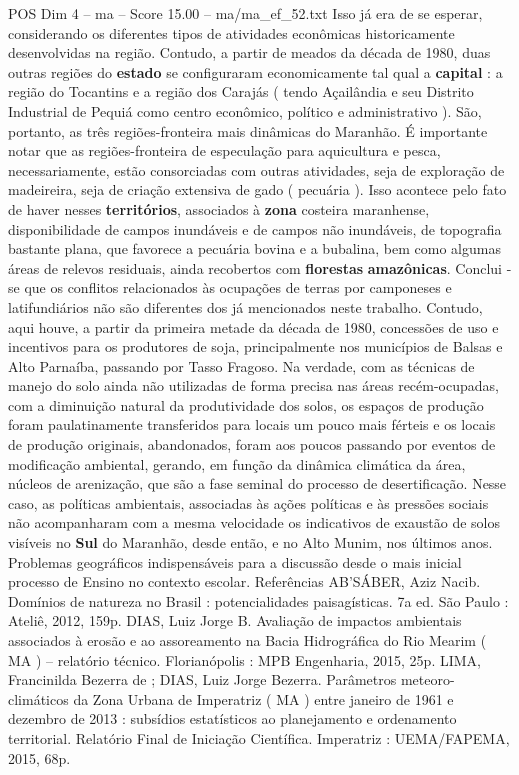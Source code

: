 \begin{textsample}{POS Dim 4 – ma – Score 15.00 – ma/ma\_ef\_52.txt}
Isso já era de se esperar, considerando os diferentes tipos de atividades econômicas historicamente desenvolvidas na região.
Contudo, a partir de meados da década de 1980, duas outras regiões do \textbf{estado} se configuraram economicamente tal qual a \textbf{capital} : a região do Tocantins e a região dos Carajás ( tendo Açailândia e seu Distrito Industrial de Pequiá como centro econômico, político e administrativo ).
São, portanto, as três regiões-fronteira mais dinâmicas do Maranhão.
É importante notar que as regiões-fronteira de especulação para aquicultura e pesca, necessariamente, estão consorciadas com outras atividades, seja de exploração de madeireira, seja de criação extensiva de gado ( pecuária ).
Isso acontece pelo fato de haver nesses \textbf{territórios}, associados à \textbf{zona} costeira maranhense, disponibilidade de campos inundáveis e de campos não inundáveis, de topografia bastante plana, que favorece a pecuária bovina e a bubalina, bem como algumas áreas de relevos residuais, ainda recobertos com \textbf{florestas} \textbf{amazônicas}.
Conclui -se que os conflitos relacionados às ocupações de terras por camponeses e latifundiários não são diferentes dos já mencionados neste trabalho.
Contudo, aqui houve, a partir da primeira metade da década de 1980, concessões de uso e incentivos para os produtores de soja, principalmente nos municípios de Balsas e Alto Parnaíba, passando por Tasso Fragoso.
Na verdade, com as técnicas de manejo do solo ainda não utilizadas de forma precisa nas áreas recém-ocupadas, com a diminuição natural da produtividade dos solos, os espaços de produção foram paulatinamente transferidos para locais um pouco mais férteis e os locais de produção originais, abandonados, foram aos poucos passando por eventos de modificação ambiental, gerando, em função da dinâmica climática da área, núcleos de arenização, que são a fase seminal do processo de desertificação.
Nesse caso, as políticas ambientais, associadas às ações políticas e às pressões sociais não acompanharam com a mesma velocidade os indicativos de exaustão de solos visíveis no \textbf{Sul} do Maranhão, desde então, e no Alto Munim, nos últimos anos.
Problemas geográficos indispensáveis para a discussão desde o mais inicial processo de Ensino no contexto escolar.
Referências AB’SÁBER, Aziz Nacib.
Domínios de natureza no Brasil : potencialidades paisagísticas. 7a ed.
São Paulo : Ateliê, 2012, 159p.
DIAS, Luiz Jorge B.
Avaliação de impactos ambientais associados à erosão e ao assoreamento na Bacia Hidrográfica do Rio Mearim ( MA ) – relatório técnico.
Florianópolis : MPB Engenharia, 2015, 25p.
LIMA, Francinilda Bezerra de ; DIAS, Luiz Jorge Bezerra.
Parâmetros meteoro-climáticos da Zona Urbana de Imperatriz ( MA ) entre janeiro de 1961 e dezembro de 2013 : subsídios estatísticos ao planejamento e ordenamento territorial.
Relatório Final de Iniciação Científica.
Imperatriz : UEMA/FAPEMA, 2015, 68p.

\end{textsample}
